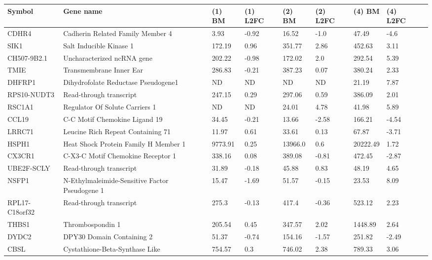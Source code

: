 \documentclass[fleqn,10pt,table]{wlscirep}
\begin{document}
\begin{table}[ht]
\scriptsize
\centering
{}
\begin{tabular}{|l|l|l|l|l|l|l|l|l|} \hline
Symbol & Gene name & (1) BM & (1) L2FC & (2) BM & (2) L2FC & (4) BM & (4) L2FC \\ \hline
CDHR4 & Cadherin Related Family Member 4 & 3.93 & -0.92 & 16.52 & -1.0 & 47.49 & -4.6 \\ \hline
SIK1 & Salt Inducible Kinase 1 & 172.19 & 0.96 & 351.77 & 2.86 & 452.63 & 3.11 \\ \hline
CH507-9B2.1 & Uncharacterized ncRNA gene & 202.22 & -0.98 & 172.02 & 2.0 & 292.54 & 5.39 \\ \hline
TMIE & Transmembrane Inner Ear & 286.83 & -0.21 & 387.23 & 0.07 & 380.24 & 2.33 \\ \hline
DHFRP1 & Dihydrofolate Reductase Pseudogene1 & ND & ND & ND & ND & 21.19 & 7.87 \\ \hline
RPS10-NUDT3 & Read-through transcript & 247.15 & 0.29 & 297.06 & 0.59 & 386.09 & 2.01 \\ \hline
RSC1A1 & Regulator Of Solute Carriers 1 & ND & ND & 24.01 & 4.78 & 41.98 & 5.89 \\ \hline
CCL19 & C-C Motif Chemokine Ligand 19 & 34.45 & -0.21 & 13.66 & -2.58 & 166.21 & -4.54 \\ \hline
LRRC71 & Leucine Rich Repeat Containing 71 & 11.97 & 0.61 & 33.61 & 0.13 & 67.87 & -3.71 \\ \hline
HSPH1 & Heat Shock Protein Family H Member 1 & 9773.91 & 0.25 & 13966.0 & 0.6 & 20222.49 & 1.72 \\ \hline
CX3CR1 & C-X3-C Motif Chemokine Receptor 1 & 338.16 & 0.08 & 389.08 & -0.81 & 472.45 & -2.87 \\ \hline
UBE2F-SCLY & Read-through transcript & 31.89 & -0.18 & 45.88 & 0.83 & 48.19 & 4.65 \\ \hline
NSFP1 & N-Ethylmaleimide-Sensitive Factor Pseudogene 1 & 15.47 & -1.69 & 51.57 & -0.15 & 23.53 & 8.09 \\ \hline
RPL17-C18orf32 & Read-through transcript & 275.3 & -0.13 & 417.4 & -0.36 & 523.12 & 2.23 \\ \hline
THBS1 & Thrombospondin 1 & 205.54 & 0.45 & 347.57 & 2.02 & 1448.89 & 2.64 \\ \hline
DYDC2 & DPY30 Domain Containing 2 & 51.37 & -0.74 & 154.16 & -1.57 & 251.82 & -2.49 \\ \hline
CBSL & Cystathione-Beta-Synthase Like & 754.57 & 0.3 & 746.02 & 2.38 & 789.33 & 3.06 \\ \hline

\end{tabular}
\end{table}
\end{document}
